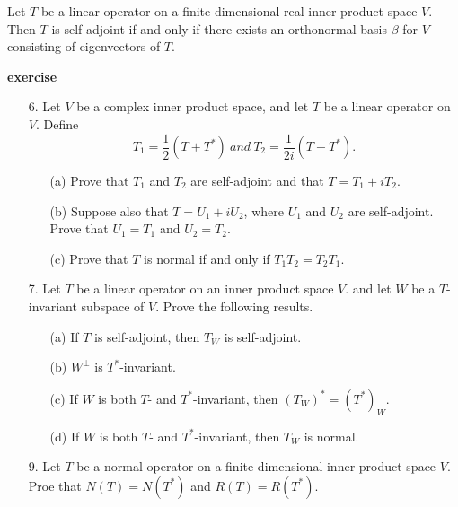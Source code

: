 \vspace{7cm}
\begin{theorem}
    Let \(T\) be a linear operator on a finite-dimensional real inner product space \(V\). Then \(T\) is self-adjoint if and only if there exists an orthonormal basis \(\beta\) for \(V\) consisting of eigenvectors of \(T\).
\end{theorem}
\vspace{3cm}
\textbf{exercise}
\begin{enumerate}
    \item[6.] Let \(V\) be a complex inner product space, and let \(T\) be a linear operator on \(V\). Define
    \[ T_1 = \frac{1}{2}(T+T^*)\ and\ T_2 = \frac{1}{2i}(T-T^*). \]
    \begin{enumerate}
        \item[(a)] Prove that \(T_1\) and \(T_2\) are self-adjoint and that \(T = T_1 + iT_2\).
        \item[(b)] Suppose also that \(T = U_1 + iU_2\), where \(U_1\) and \(U_2\) are self-adjoint. Prove that \(U_1 = T_1\) and \(U_2 = T_2\).
        \item[(c)] Prove that \(T\) is normal if and only if \(T_1T_2 = T_2T_1\).
    \end{enumerate}
    \newpage
    \item[7.] Let \(T\) be a linear operator on an inner product space \(V\). and let \(W\) be a \(T\)-invariant subspace of \(V\). Prove the following results.
    \begin{enumerate}
        \item[(a)] If \(T\) is self-adjoint, then \(T_W\) is self-adjoint.
        \item[(b)] \(W^\perp\) is \(T^*\)-invariant.
        \item[(c)] If \(W\) is both \(T\)- and \(T^*\)-invariant, then \((T_W)^* = (T^*)_W\).
        \item[(d)] If \(W\) is both \(T\)- and \(T^*\)-invariant, then \(T_W\) is normal.
    \end{enumerate}
    \vspace{5cm}
    \item[9.] Let \(T\) be a normal operator on a finite-dimensional inner product space \(V\). Proe that \(N(T) = N(T^*)\) and \(R(T) = R(T^*)\). \vspace{3cm}
\end{enumerate}
